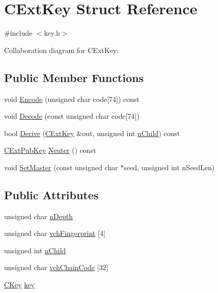 \hypertarget{struct_c_ext_key}{}\section{C\+Ext\+Key Struct Reference}
\label{struct_c_ext_key}


{\ttfamily \#include $<$key.\+h$>$}



Collaboration diagram for C\+Ext\+Key\+:
\subsection*{Public Member Functions}
\begin{DoxyCompactItemize}
\item 
void \hyperlink{struct_c_ext_key_aa60d612abaa124e00f66f81ac4a74699}{Encode} (unsigned char code\mbox{[}74\mbox{]}) const 
\item 
void \hyperlink{struct_c_ext_key_a9720e119745472336b6729e19f0819dd}{Decode} (const unsigned char code\mbox{[}74\mbox{]})
\item 
bool \hyperlink{struct_c_ext_key_a2fa3a39434ae09efbbd4058d1d081aa2}{Derive} (\hyperlink{struct_c_ext_key}{C\+Ext\+Key} \&out, unsigned int \hyperlink{struct_c_ext_key_ad15cb7ab68b59495eec71f6586803048}{n\+Child}) const 
\item 
\hyperlink{struct_c_ext_pub_key}{C\+Ext\+Pub\+Key} \hyperlink{struct_c_ext_key_a49f98a470d61ab1f2948b7c414ec9563}{Neuter} () const 
\item 
void \hyperlink{struct_c_ext_key_a8cd6ecafdd649082601d7eebbec79688}{Set\+Master} (const unsigned char $\ast$seed, unsigned int n\+Seed\+Len)
\end{DoxyCompactItemize}
\subsection*{Public Attributes}
\begin{DoxyCompactItemize}
\item 
unsigned char \hyperlink{struct_c_ext_key_ab197a253f41646975405b4ead8027b55}{n\+Depth}
\item 
unsigned char \hyperlink{struct_c_ext_key_a22efb3f5dfb26cd8d88d2ab5db885978}{vch\+Fingerprint} \mbox{[}4\mbox{]}
\item 
unsigned int \hyperlink{struct_c_ext_key_ad15cb7ab68b59495eec71f6586803048}{n\+Child}
\item 
unsigned char \hyperlink{struct_c_ext_key_a637ce75955e2883d20172b707c26a459}{vch\+Chain\+Code} \mbox{[}32\mbox{]}
\item 
\hyperlink{class_c_key}{C\+Key} \hyperlink{struct_c_ext_key_a93cd93ef3311d9dbcf475282a5f80fb2}{key}
\end{DoxyCompactItemize}
